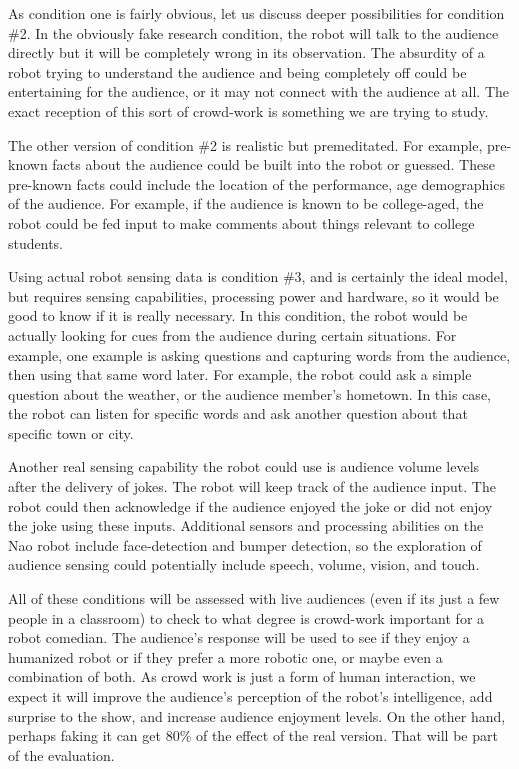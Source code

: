 ﻿\documentclass[onecolumn, draftclsnofoot,10pt, compsoc]{IEEEtran}
\begin{document}
As condition one is fairly obvious, let us discuss deeper possibilities for condition \#2. In the obviously fake research condition, the robot will talk to the audience directly but it will be completely wrong in its observation. The absurdity of a robot trying to understand the audience and being completely off could be entertaining for the audience, or it may not connect with the audience at all. The exact reception of this sort of crowd-work is something we are trying to study.

The other version of condition \#2 is realistic but premeditated. For example, pre-known facts about the audience could be built into the robot or guessed. These pre-known facts could include the location of the performance, age demographics of the audience. For example, if the audience is known to be college-aged, the robot could be fed input to make comments about things relevant to college students.

Using actual robot sensing data is condition \#3, and is certainly the ideal model, but requires sensing capabilities, processing power and hardware, so it would be good to know if it is really necessary. In this condition, the robot would be actually looking for cues from the audience during certain situations. For example, one example is asking questions and capturing words from the audience, then using that same word later. For example, the robot could ask a simple question about the weather, or the audience member's hometown. In this case, the robot can listen for specific words and ask another question about that specific town or city.

Another real sensing capability the robot could use is  audience volume levels after the delivery of jokes. The robot will keep track of the audience input. The robot could then acknowledge if the audience enjoyed the joke or did not enjoy the joke using these inputs. Additional sensors and processing abilities on the Nao robot include face-detection and bumper detection, so the exploration of audience sensing could potentially include speech, volume, vision, and touch.

All of these conditions will be assessed with live audiences (even if its just a few people in a classroom) to check to what degree is crowd-work important for a robot comedian. The audience's response will be used to see if they enjoy a humanized robot or if they prefer a more robotic one, or maybe even a combination of both. As crowd work is just a form of human interaction, we expect it will improve the audience's perception of the robot's intelligence, add surprise to the show, and increase audience enjoyment levels. On the other hand, perhaps faking it can get 80\% of the effect of the real version. That will be part of the evaluation.
\end{document}
